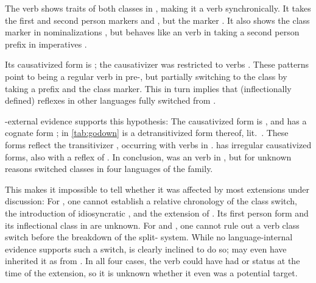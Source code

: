 

The verb shows traits of both classes in \wayana, making it a  verb synchronically.
It takes the first and second person  markers  and  \parencite[200]{wayanatavares2005}, but the  marker  \parencite[206]{wayanatavares2005}.
It also shows the  class marker  in nominalizations , but behaves like an  verb in taking a second person prefix in imperatives .

%
Its causativized form is  \parencite[255]{wayanatavares2005}; the \PC  causativizer  was restricted to  verbs \parencite{gildea2019overview}.
These patterns point to  being a regular  verb in pre-\wayana, but partially switching to the  class by taking a  prefix and the  class marker.
This in turn implies that (inflectionally defined)  reflexes in other languages fully switched from .

\wayana-external evidence supports this hypothesis:
The \arara causativized form is  \parencite[66]{alves2017arara}, and \kalina has a cognate form  \parencite[263]{courtz2008carib};   in \cref{tab:godown} is a detransitivized form thereof, lit.\ .
These forms reflect the transitivizer , occurring with  verbs in \PC \parencite{gildea2019overview}.
\trio {} has irregular causativized forms, also with a reflex of  \parencite[263]{triomeira1999}.
In conclusion,   was an  verb in \PC, but for unknown reasons switched classes in four  languages of the family.

This makes it impossible to tell whether it was affected by most extensions under discussion:
For \PTir, one cannot establish a relative chronology of the class switch, the introduction of idiosyncratic  , and the extension of .
Its first person form and its inflectional class in \PWai are unknown.
For \carijo and \yukpa, one cannot rule out a verb class switch before the breakdown of the split- system.
While no language-internal evidence supports such a switch,  is clearly inclined to do so; \carijo may even have inherited it as  from \PTar.
In all four cases, the verb could have had  or  status at the time of the extension, so it is unknown whether it even was a potential target.

